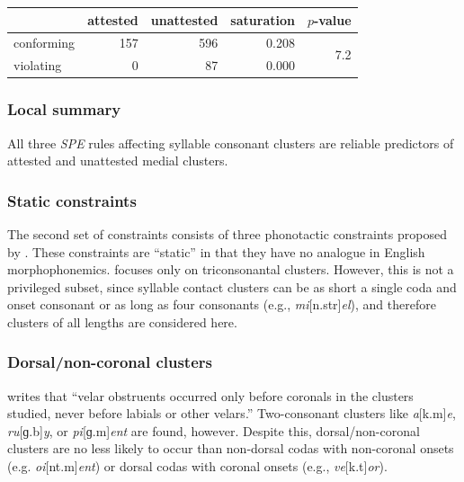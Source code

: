 \begin{example} 
\begin{tabular}{l r r r r}
\toprule
           & attested & unattested & saturation & $p$-value                   \\
\midrule
conforming & 157      & 596        & 0.208      & \multirow{2}{*}{7.2\e{-09}} \\
violating  & 0        &  87        & 0.000                                    \\
\bottomrule
\end{tabular}
\end{example}

\subsubsection{Local summary}

All three \emph{SPE} rules affecting syllable consonant clusters are reliable predictors of attested and unattested medial clusters.

\subsubsection{Static constraints}

The second set of constraints consists of three phonotactic constraints proposed by \citet{Pierrehumbert1994}. These constraints are ``static'' in that they have no analogue in English morphophonemics. \citeauthor{Pierrehumbert1994} focuses only on triconsonantal clusters. However, this is not a privileged subset, since syllable contact clusters can be as short a single coda and onset consonant or as long as four consonants (e.g., \emph{mi}[n.str]\emph{el}), and therefore clusters of all lengths are considered here.

\subsubsection{Dorsal/non-coronal clusters}

\citet[173]{Pierrehumbert1994} writes that ``velar obstruents occurred only before coronals in the clusters studied, never before labials or other velars.'' Two-consonant clusters like \emph{a}[k.m]\emph{e}, \emph{ru}[ɡ.b]\emph{y}, or \emph{pi}[ɡ.m]\emph{ent} are found, however. Despite this, dorsal/non-coronal clusters are no less likely to occur than non-dorsal codas with non-coronal onsets (e.g. \emph{oi}[nt.m]\emph{ent}) or dorsal codas with coronal onsets (e.g., \emph{ve}[k.t]\emph{or}).

